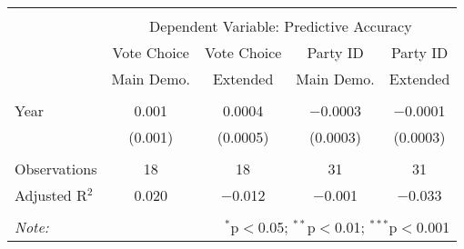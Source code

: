 
\begin{tabular}{@{\extracolsep{5pt}}lcccc} 
\\[-1.8ex]\midrule 
\midrule \\[-1.8ex] 
 & \multicolumn{4}{c}{Dependent Variable: Predictive Accuracy} \\ 
\cmidrule{2-5} 
 & Vote Choice & Vote Choice & Party ID & Party ID \\ & Main Demo. & Extended & Main Demo. & Extended \\ 
\midrule \\[-1.8ex] 
 Year & 0.001 & 0.0004 & $-$0.0003 & $-$0.0001 \\ 
  & (0.001) & (0.0005) & (0.0003) & (0.0003) \\ 
 \midrule \\[-1.8ex] 
Observations & 18 & 18 & 31 & 31 \\ 
Adjusted R$^{2}$ & 0.020 & $-$0.012 & $-$0.001 & $-$0.033 \\ 
\midrule 
\midrule \\[-1.8ex] 
\textit{Note:}  & \multicolumn{4}{r}{$^{*}$p$<$0.05; $^{**}$p$<$0.01; $^{***}$p$<$0.001} \\ 
\end{tabular} 
